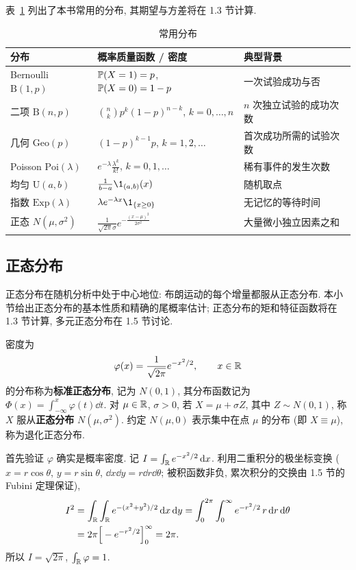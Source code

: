 表~\ref{tab:distributions} 列出了本书常用的分布, 其期望与方差将在 1.3 节计算.

\begin{table}[htbp]
\centering
\caption{常用分布}
\label{tab:distributions}
\renewcommand{\arraystretch}{1.5}
\begin{tabular}{lll}
\toprule
分布 & 概率质量函数 / 密度 & 典型背景 \\
\midrule
Bernoulli $\mathrm{B}(1,p)$ & $\P(X=1)=p$, $\P(X=0)=1-p$ & 一次试验成功与否 \\
二项 $\mathrm{B}(n,p)$ & $\binom{n}{k}p^k(1-p)^{n-k}$, $k=0,\dots,n$ & $n$ 次独立试验的成功次数 \\
几何 $\mathrm{Geo}(p)$ & $(1-p)^{k-1}p$, $k=1,2,\dots$ & 首次成功所需的试验次数 \\
Poisson $\mathrm{Poi}(\lambda)$ & $e^{-\lambda}\frac{\lambda^k}{k!}$, $k=0,1,\dots$ & 稀有事件的发生次数 \\
\midrule
均匀 $\mathrm{U}(a,b)$ & $\frac{1}{b-a}\1_{(a,b)}(x)$ & 随机取点 \\
指数 $\mathrm{Exp}(\lambda)$ & $\lambda e^{-\lambda x}\1_{\{x\ge0\}}$ & 无记忆的等待时间 \\
正态 $N(\mu,\sigma^2)$ & $\frac{1}{\sqrt{2\pi}\sigma}e^{-\frac{(x-\mu)^2}{2\sigma^2}}$ & 大量微小独立因素之和 \\
\bottomrule
\end{tabular}
\end{table}

\subsection{正态分布}

正态分布在随机分析中处于中心地位: 布朗运动的每个增量都服从正态分布. 本小节给出正态分布的基本性质和精确的尾概率估计; 正态分布的矩和特征函数将在 1.3 节计算, 多元正态分布在 1.5 节讨论.

\begin{definition}[正态分布]\label{def:normal}
密度为
\[
\varphi(x)=\frac{1}{\sqrt{2\pi}}e^{-x^2/2},\qquad x\in\R
\]
的分布称为\textbf{标准正态分布}, 记为 $N(0,1)$, 其分布函数记为 $\Phi(x)=\int_{-\infty}^x\varphi(t)\dd t$. 对 $\mu\in\R$, $\sigma>0$, 若 $X=\mu+\sigma Z$, 其中 $Z\sim N(0,1)$, 称 $X$ 服从\textbf{正态分布} $N(\mu,\sigma^2)$. 约定 $N(\mu,0)$ 表示集中在点 $\mu$ 的分布 (即 $X\equiv\mu$), 称为退化正态分布.
\end{definition}

首先验证 $\varphi$ 确实是概率密度. 记 $I=\int_{\R}e^{-x^2/2}\dd x$. 利用二重积分的极坐标变换 ($x=r\cos\theta$, $y=r\sin\theta$, $\dd x\dd y=r\dd r\dd\theta$; 被积函数非负, 累次积分的交换由 1.5 节的 Fubini 定理保证),
\begin{align*}
I^2&=\int_{\R}\int_{\R}e^{-(x^2+y^2)/2}\dd x\dd y=\int_0^{2\pi}\int_0^\infty e^{-r^2/2}\,r\dd r\dd\theta\\
&=2\pi\Big[-e^{-r^2/2}\Big]_0^\infty=2\pi.
\end{align*}
所以 $I=\sqrt{2\pi}$, $\int_{\R}\varphi=1$.

